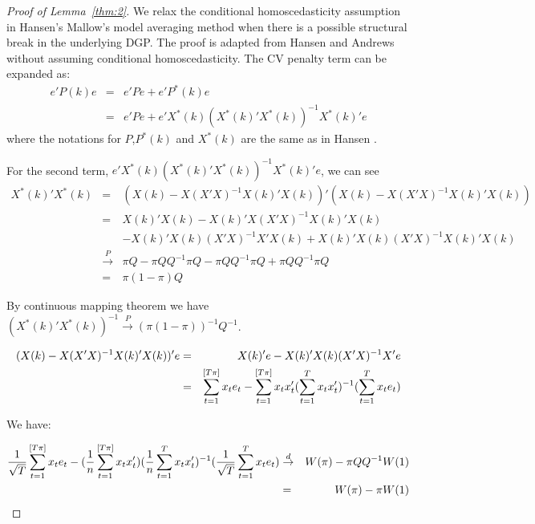 \begin{proof}[Proof of Lemma~\ref{thm:2}]
We relax the conditional homoscedasticity assumption in Hansen's Mallow's model averaging method when there is a possible structural break in the underlying DGP. The proof is adapted from Hansen \cite{hansen2009averaging} and Andrews \cite{andrews93} without assuming conditional homoscedasticity. The CV penalty term can be expanded as:
\begin{eqnarray*}
e'P(k)e & = & e'Pe + e'P^{*}(k)e \\
        & = & e'Pe + e'X^{*}(k)(X^{*}(k)'X^{*}(k))^{-1}X^{*}(k)'e
\end{eqnarray*}
where the notations for $P$,$P^{*}(k)$ and $X^{*}(k)$ are the same as in Hansen \cite{hansen2009averaging}.

For the second term, $e'X^{*}(k)(X^{*}(k)'X^{*}(k))^{-1}X^{*}(k)'e$, we can see
\begin{eqnarray*}
X^{*}(k)'X^{*}(k) & = & (X(k)-X(X'X)^{-1}X(k)'X(k))'(X(k)-X(X'X)^{-1}X(k)'X(k)) \\
                  & = & X(k)'X(k) - X(k)'X(X'X)^{-1}X(k)'X(k) \\
				  &   & - X(k)'X(k)(X'X)^{-1}X'X(k) + X(k)'X(k)(X'X)^{-1}X(k)'X(k) \\
				  & \stackrel{P}{\rightarrow} & \pi Q - \pi QQ^{-1} \pi Q - \pi QQ^{-1} \pi Q + \pi QQ^{-1} \pi Q \\
				  & = & \pi (1-\pi)Q
\end{eqnarray*}

By continuous mapping theorem we have $(X^{*}(k)'X^{*}(k))^{-1}\stackrel{P}{\rightarrow}(\pi (1-\pi))^{-1}Q^{-1}$.

\begin{eqnarray*}
(X(k) - X(X'X)^{-1}X(k)'X(k))'e & = & X(k)'e - X(k)'X(k)(X'X)^{-1}X'e \\
                                & = & \sum_{t=1}^{[T \pi]} x_t e_t - \sum_{t=1}^{[T \pi]} x_t x_t'(\sum_{t=1}^{T} x_t x_t')^{-1}(\sum_{t=1}^{T} x_t e_t)
\end{eqnarray*}

We have:

\begin{eqnarray*}
\frac{1}{\sqrt{T}} \sum_{t=1}^{[T \pi]} x_t e_t - (\frac{1}{n} \sum_{t=1}^{[T \pi]} x_t x_t')(\frac{1}{n} \sum_{t=1}^{T} x_t x_t')^{-1}(\frac{1}{\sqrt{T}} \sum_{t=1}^{T} x_t e_t) & \stackrel{d}{\rightarrow} & W(\pi) - \pi Q Q^{-1}W(1) \\
                                                                                                   & =                         & W(\pi) - \pi W(1)
\end{eqnarray*}


\end{proof}
